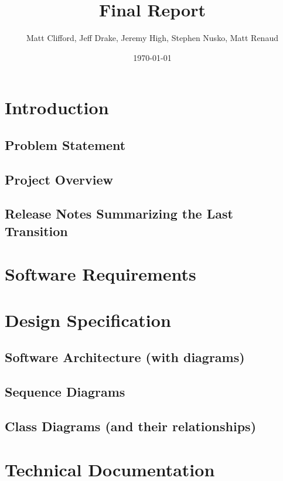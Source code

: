\documentclass[11pt]{article}
\title{Final Report}
\author{Matt Clifford, Jeff Drake, Jeremy High, Stephen Nusko, Matt Renaud}
\date{\today}
\begin{document}
\maketitle

\setcounter{tocdepth}{3}
\tableofcontents
\vspace*{1cm}

\section{Introduction}

\subsection{Problem Statement}

\subsection{Project Overview}

\subsection{Release Notes Summarizing the Last Transition}

\section{Software Requirements}

\section{Design Specification}

\subsection{Software Architecture (with diagrams)}

\subsection{Sequence Diagrams}

\subsection{Class Diagrams (and their relationships)}

\section{Technical Documentation}
\end{document}
